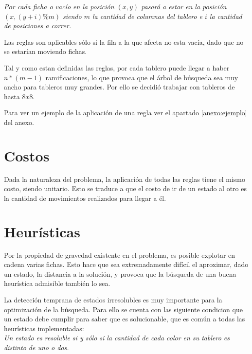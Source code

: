 \documentclass[%
    final,
    reprint,
    notitlepage,
    narroweqnarray,
    inline,
    twoside,
    invited
    ]{ieee}
\begin{document}
\emph{Por cada ficha o vac\'io en la posici\'on $(x, y)$ pasar\'a a estar en la posici\'on $(x, (y+i)\%m)$ siendo $m$ la cantidad de columnas del tablero e $i$ la cantidad de posiciones a correr.}\\

\par Las reglas son aplicables s\'olo si la fila a la que afecta no esta vac\'ia, dado que no se estar\'ian moviendo fichas. \\
\par Tal y como estan definidas las reglas, por cada tablero puede llegar a haber $n*(m-1)$ ramificaciones, lo que provoca que el \'arbol de b\'usqueda sea muy ancho para tableros muy grandes. Por ello se decidi\'o trabajar con tableros de hasta $8x8$.\\
\par Para ver un ejemplo de la aplicaci\'on de una regla ver el apartado \ref{anexo:ejemplo} del anexo.

\section{Costos}
\par Dada la naturaleza del problema, la aplicaci\'on de todas las reglas tiene el mismo costo, siendo unitario. Esto se traduce a que el costo de ir de un estado al otro es la cantidad de movimientos realizados para llegar a \'el.

\section{Heur\'isticas}
\par Por la propiedad de gravedad existente en el problema, es posible explotar en cadena varias fichas. Esto hace que sea extremadamente dif\'icil el aproximar, dado un estado, la distancia a la soluci\'on, y provoca que la b\'usqueda de una buena heur\'istica admisible tambi\'en lo sea.\\
\par La detecci\'on temprana de estados irresolubles es muy importante para la optimizaci\'on de la b\'usqueda. Para ello se cuenta con las siguiente condicion que un estado debe cumplir para saber que es solucionable, que es com\'un a todas las heur\'isticas implementadas:\\

\emph{Un estado es resoluble si y s\'olo si la cantidad de cada color en su tablero es distinto de uno o dos.}\\
\end{document}
